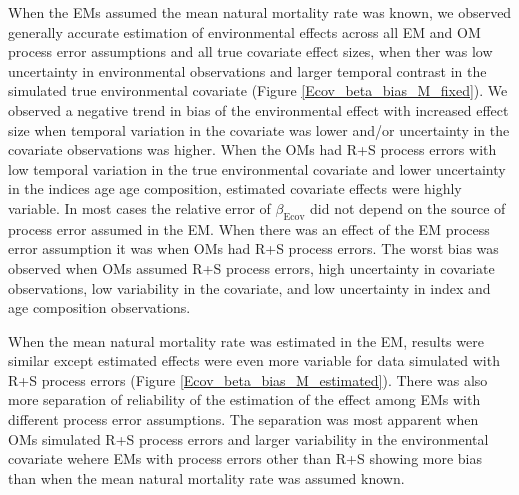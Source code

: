 \documentclass[
  12pt,
]{article}
\begin{document}
When the EMs assumed the mean natural mortality rate was known, we
observed generally accurate estimation of environmental effects across
all EM and OM process error assumptions and all true covariate effect
sizes, when ther was low uncertainty in environmental observations and
larger temporal contrast in the simulated true environmental covariate
(Figure \ref{Ecov_beta_bias_M_fixed}). We observed a negative trend in
bias of the environmental effect with increased effect size when
temporal variation in the covariate was lower and/or uncertainty in the
covariate observations was higher. When the OMs had R+S process errors
with low temporal variation in the true environmental covariate and
lower uncertainty in the indices age age composition, estimated
covariate effects were highly variable. In most cases the relative error
of \(\beta_\text{Ecov}\) did not depend on the source of process error
assumed in the EM. When there was an effect of the EM process error
assumption it was when OMs had R+S process errors. The worst bias was
observed when OMs assumed R+S process errors, high uncertainty in
covariate observations, low variability in the covariate, and low
uncertainty in index and age composition observations.

When the mean natural mortality rate was estimated in the EM, results
were similar except estimated effects were even more variable for data
simulated with R+S process errors (Figure
\ref{Ecov_beta_bias_M_estimated}). There was also more separation of
reliability of the estimation of the effect among EMs with different
process error assumptions. The separation was most apparent when OMs
simulated R+S process errors and larger variability in the environmental
covariate wehere EMs with process errors other than R+S showing more
bias than when the mean natural mortality rate was assumed known.
\end{document}
